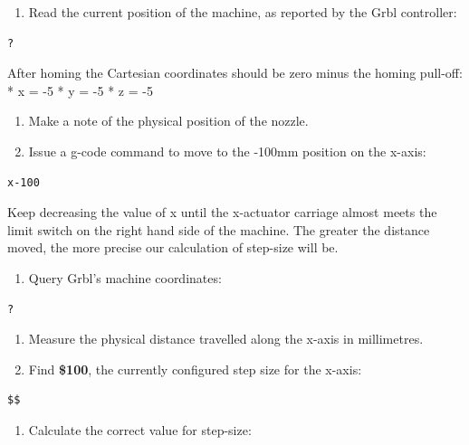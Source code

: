 \documentclass[
]{book}
\providecommand{\tightlist}{%
  \setlength{\itemsep}{0pt}\setlength{\parskip}{0pt}}
\begin{document}
\begin{enumerate}
\def\labelenumi{\arabic{enumi}.}
\setcounter{enumi}{1}
\tightlist
\item
  Read the current position of the machine, as reported by the Grbl controller:
\end{enumerate}

\begin{verbatim}
?
\end{verbatim}

After homing the Cartesian coordinates should be zero minus the homing pull-off:
* x = -5
* y = -5
* z = -5

\begin{enumerate}
\def\labelenumi{\arabic{enumi}.}
\setcounter{enumi}{2}
\item
  Make a note of the physical position of the nozzle.
\item
  Issue a g-code command to move to the -100mm position on the x-axis:
\end{enumerate}

\begin{verbatim}
x-100
\end{verbatim}

Keep decreasing the value of x until the x-actuator carriage almost meets the limit switch on the right hand side of the machine. The greater the distance moved, the more precise our calculation of step-size will be.

\begin{enumerate}
\def\labelenumi{\arabic{enumi}.}
\setcounter{enumi}{4}
\tightlist
\item
  Query Grbl's machine coordinates:
\end{enumerate}

\begin{verbatim}
?
\end{verbatim}

\begin{enumerate}
\def\labelenumi{\arabic{enumi}.}
\setcounter{enumi}{5}
\item
  Measure the physical distance travelled along the x-axis in millimetres.
\item
  Find \textbf{\$100}, the currently configured step size for the x-axis:
\end{enumerate}

\begin{verbatim}
$$
\end{verbatim}

\begin{enumerate}
\def\labelenumi{\arabic{enumi}.}
\setcounter{enumi}{7}
\tightlist
\item
  Calculate the correct value for step-size:
\end{enumerate}
\end{document}
